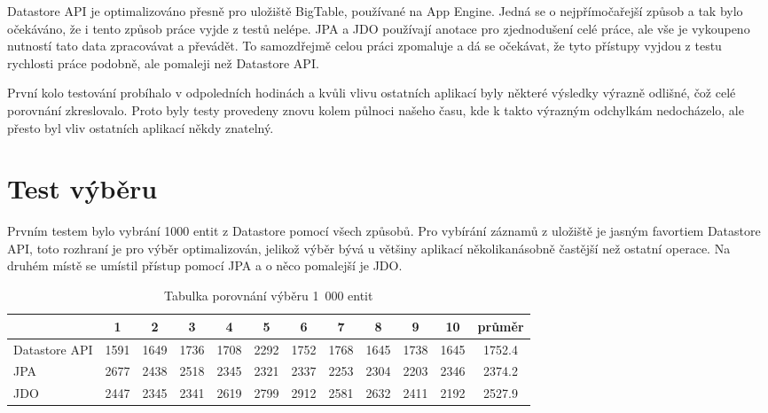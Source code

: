 Datastore API je optimalizováno přesně pro uložiště BigTable, používané na App Engine. Jedná se o nejpřímočařejší způsob a tak bylo očekáváno, že i tento způsob práce vyjde z testů nelépe. JPA a JDO používají anotace pro zjednodušení celé práce, ale vše je vykoupeno nutností tato data zpracovávat a převádět. To samozdřejmě celou práci zpomaluje a dá se očekávat, že tyto přístupy vyjdou z testu rychlosti práce podobně, ale pomaleji než Datastore API.

První kolo testování probíhalo v odpoledních hodinách a kvůli vlivu ostatních aplikací byly některé výsledky výrazně odlišné, čož celé porovnání zkreslovalo. Proto byly testy provedeny znovu kolem půlnoci našeho času, kde k takto výrazným odchylkám nedocházelo, ale přesto byl vliv ostatních aplikací někdy znatelný.

\section{Test výběru}
Prvním testem bylo vybrání 1000 entit z Datastore pomocí všech způsobů. Pro vybírání záznamů z uložiště je jasným favortiem Datastore API, toto rozhraní je pro výběr optimalizován, jelikož výběr bývá u většiny aplikací několikanásobně častější než ostatní operace. Na druhém místě se umístil přístup pomocí JPA a o něco pomalejší je JDO.

\begin{table}[h]
\centering
\caption{Tabulka porovnání výběru 1~000 entit }\label{tab:select}
\begin{tabular}{|l|c|c|c|c|c|c|c|c|c|c|c|}
   \hline
	& 1		& 2		& 3		& 4		& 5		& 6		& 7		& 8		& 9		& 10		& průměr \\
   \hline
Datastore API	& 1591	& 1649	& 1736	& 1708	& 2292	& 1752	& 1768	& 1645	& 1738	& 1645	& 1752.4 \\
JPA	& 2677	& 2438	& 2518	& 2345	& 2321	& 2337	& 2253	& 2304	& 2203	& 2346	& 2374.2 \\
JDO	& 2447	& 2345	& 2341	& 2619	& 2799	& 2912	& 2581	& 2632	& 2411	& 2192	& 2527.9 \\
   \hline
\end{tabular}
\end{table}

